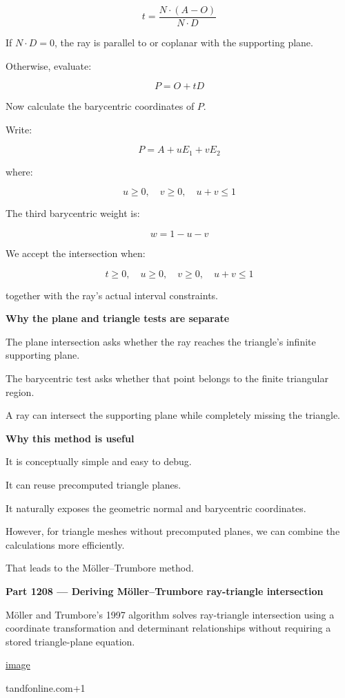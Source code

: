 \[
\boxed{ t=\frac{N\cdot(A-O)}{N\cdot D} }
\]

If \(N\cdot D=0\), the ray is parallel to or coplanar with the supporting plane.

Otherwise, evaluate:

\[
P=O+tD
\]

Now calculate the barycentric coordinates of \(P\).

Write:

\[
P=A+uE_1+vE_2
\]

where:

\[
u\ge0,\quad v\ge0,\quad u+v\le1
\]

The third barycentric weight is:

\[
w=1-u-v
\]

We accept the intersection when:

\[
\boxed{ t\ge0,\quad u\ge0,\quad v\ge0,\quad u+v\le1 }
\]

together with the ray's actual interval constraints.

\textbf{Why the plane and triangle tests are separate}

The plane intersection asks whether the ray reaches the triangle's infinite supporting plane.

The barycentric test asks whether that point belongs to the finite triangular region.

A ray can intersect the supporting plane while completely missing the triangle.

\textbf{Why this method is useful}

It is conceptually simple and easy to debug.

It can reuse precomputed triangle planes.

It naturally exposes the geometric normal and barycentric coordinates.

However, for triangle meshes without precomputed planes, we can combine the calculations more efficiently.

That leads to the Möller--Trumbore method.

\textbf{Part 1208 --- Deriving Möller--Trumbore ray-triangle intersection}

Möller and Trumbore's 1997 algorithm solves ray-triangle intersection using a coordinate transformation and determinant relationships without requiring a stored triangle-plane equation. 

\href{https://www.google.com/s2/favicons?domain=https://www.tandfonline.com&sz=32}{image}

tandfonline.com+1

